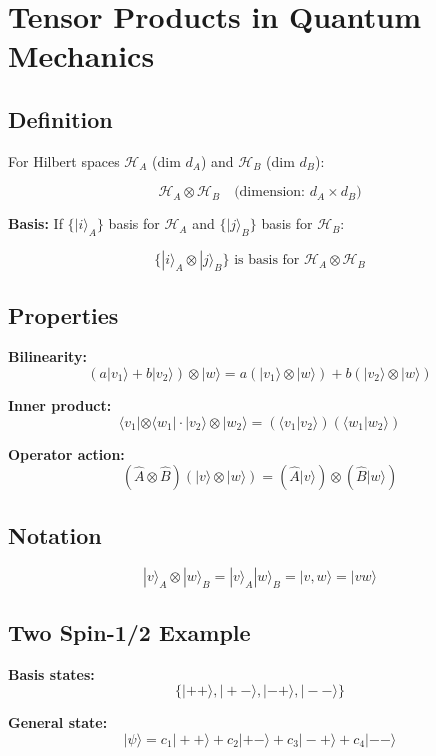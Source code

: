 \documentclass[11pt,a4paper]{article}
\begin{document}
\section{Tensor Products in Quantum Mechanics}

\subsection{Definition}

For Hilbert spaces $\mathcal{H}_A$ (dim $d_A$) and $\mathcal{H}_B$ (dim $d_B$):

$$\mathcal{H}_A \otimes \mathcal{H}_B \quad \text{(dimension: } d_A \times d_B\text{)}$$

\textbf{Basis:} If $\{|i\rangle_A\}$ basis for $\mathcal{H}_A$ and $\{|j\rangle_B\}$ basis for $\mathcal{H}_B$:

$$\{|i\rangle_A \otimes |j\rangle_B\} \text{ is basis for } \mathcal{H}_A \otimes \mathcal{H}_B$$

\subsection{Properties}

\textbf{Bilinearity:}
$$(a|v_1\rangle + b|v_2\rangle) \otimes |w\rangle = a(|v_1\rangle \otimes |w\rangle) + b(|v_2\rangle \otimes |w\rangle)$$

\textbf{Inner product:}
$$\langle v_1| \otimes \langle w_1| \cdot |v_2\rangle \otimes |w_2\rangle = (\langle v_1|v_2\rangle)(\langle w_1|w_2\rangle)$$

\textbf{Operator action:}
$$(\hat{A} \otimes \hat{B})(|v\rangle \otimes |w\rangle) = (\hat{A}|v\rangle) \otimes (\hat{B}|w\rangle)$$

\subsection*{Notation}

$$|v\rangle_A \otimes |w\rangle_B = |v\rangle_A|w\rangle_B = |v, w\rangle = |vw\rangle$$

\subsection{Two Spin-1/2 Example}

\textbf{Basis states:}
$$\{|++\rangle, |+-\rangle, |-+\rangle, |--\rangle\}$$

\textbf{General state:}
$$|\psi\rangle = c_1|++\rangle + c_2|+-\rangle + c_3|-+\rangle + c_4|--\rangle$$
\end{document}
